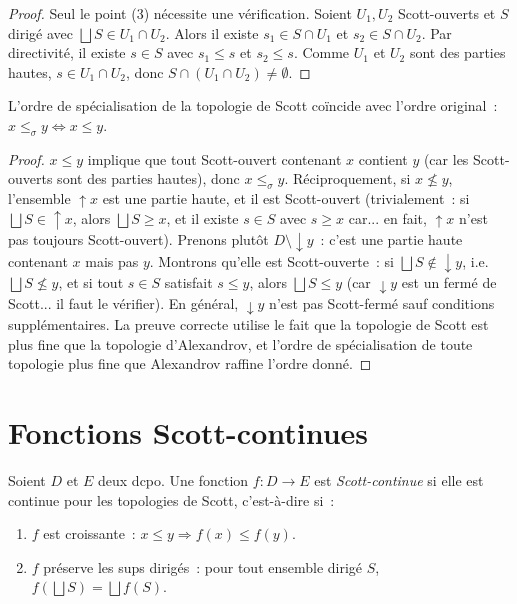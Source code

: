 \begin{proof}
Seul le point (3) n\'ecessite une v\'erification. Soient $U_1, U_2$ Scott-ouverts et
$S$ dirig\'e avec $\bigsqcup S \in U_1 \cap U_2$. Alors il existe $s_1 \in S \cap U_1$
et $s_2 \in S \cap U_2$. Par directivit\'e, il existe $s \in S$ avec $s_1 \leq s$ et
$s_2 \leq s$. Comme $U_1$ et $U_2$ sont des parties hautes, $s \in U_1 \cap U_2$, donc
$S \cap (U_1 \cap U_2) \neq \emptyset$.
\end{proof}

\begin{proposition}
L'ordre de sp\'ecialisation de la topologie de Scott co\"incide avec l'ordre original~:
$x \leq_\sigma y \Leftrightarrow x \leq y$.
\end{proposition}

\begin{proof}
$x \leq y$ implique que tout Scott-ouvert contenant $x$ contient $y$ (car les Scott-ouverts
sont des parties hautes), donc $x \leq_\sigma y$. R\'eciproquement, si $x \not\leq y$,
l'ensemble $\uparrow\! x$ est une partie haute, et il est Scott-ouvert (trivialement~:
si $\bigsqcup S \in \uparrow\! x$, alors $\bigsqcup S \geq x$, et il existe $s \in S$
avec $s \geq x$ car... en fait, $\uparrow\! x$ n'est pas toujours Scott-ouvert). Prenons
plut\^ot $D \setminus \downarrow\! y$~: c'est une partie haute contenant $x$ mais pas $y$.
Montrons qu'elle est Scott-ouverte~: si $\bigsqcup S \notin \downarrow\! y$, i.e.
$\bigsqcup S \not\leq y$, et si tout $s \in S$ satisfait $s \leq y$, alors
$\bigsqcup S \leq y$ (car $\downarrow\! y$ est un ferm\'e de Scott... il faut le v\'erifier).
En g\'en\'eral, $\downarrow\! y$ n'est pas Scott-ferm\'e sauf conditions suppl\'ementaires.
La preuve correcte utilise le fait que la topologie de Scott est plus fine que la topologie
d'Alexandrov, et l'ordre de sp\'ecialisation de toute topologie plus fine que Alexandrov
raffine l'ordre donn\'e.
\end{proof}

\section{Fonctions Scott-continues}

\begin{definition}
Soient $D$ et $E$ deux dcpo. Une fonction $f\colon D \to E$ est \emph{Scott-continue}
si elle est continue pour les topologies de Scott, c'est-\`a-dire si~:
\begin{enumerate}
  \item $f$ est croissante~: $x \leq y \Rightarrow f(x) \leq f(y)$.
  \item $f$ pr\'eserve les sups dirig\'es~: pour tout ensemble dirig\'e $S$,
    $f(\bigsqcup S) = \bigsqcup f(S)$.
\end{enumerate}
\end{definition}

